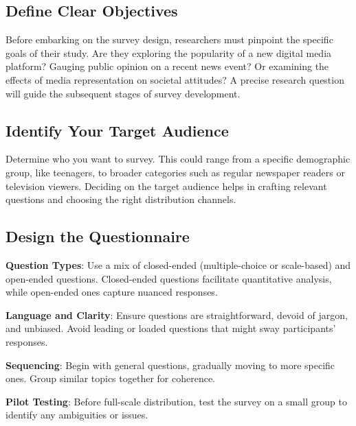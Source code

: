 \documentclass[
  b5paper]{book}
\begin{document}
\hypertarget{define-clear-objectives}{%
\subsection*{Define Clear Objectives}\label{define-clear-objectives}}

Before embarking on the survey design, researchers must pinpoint the specific goals of their study.
Are they exploring the popularity of a new digital media platform?
Gauging public opinion on a recent news event?
Or examining the effects of media representation on societal attitudes?
A precise research question will guide the subsequent stages of survey development.

\hypertarget{identify-your-target-audience}{%
\subsection*{Identify Your Target Audience}\label{identify-your-target-audience}}

Determine who you want to survey.
This could range from a specific demographic group, like teenagers, to broader categories such as regular newspaper readers or television viewers.
Deciding on the target audience helps in crafting relevant questions and choosing the right distribution channels.

\hypertarget{design-the-questionnaire}{%
\subsection*{Design the Questionnaire}\label{design-the-questionnaire}}

\textbf{Question Types}: Use a mix of closed-ended (multiple-choice or scale-based) and open-ended questions.
Closed-ended questions facilitate quantitative analysis, while open-ended ones capture nuanced responses.

\textbf{Language and Clarity}: Ensure questions are straightforward, devoid of jargon, and unbiased.
Avoid leading or loaded questions that might sway participants' responses.

\textbf{Sequencing}: Begin with general questions, gradually moving to more specific ones.
Group similar topics together for coherence.

\textbf{Pilot Testing}: Before full-scale distribution, test the survey on a small group to identify any ambiguities or issues.
\end{document}
